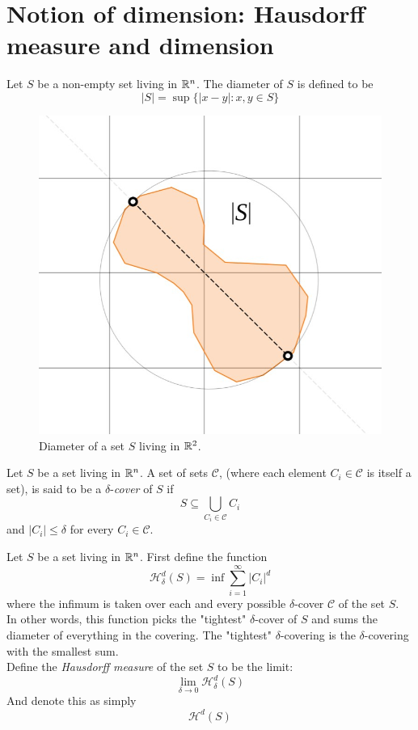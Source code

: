 \documentclass[11pt]{ekblite}
\begin{document}
\section{Notion of dimension: Hausdorff measure and dimension}
\begin{definition}
	Let $S$ be a non-empty set living in $\mathbb{R}^n$. The diameter of $S$ is defined to be 
	\[|S| = \sup \{|x - y| : x,y \in S\}\] 
\end{definition}
\begin{figure}[h]
	\includegraphics[scale=0.25]{img/c14.jpg}
	\caption{Diameter of a set $S$ living in $\mathbb{R}^2$.}
\end{figure}
\begin{definition}
	Let $S$ be a set living in $\mathbb{R}^n$. A set of sets $\mathcal{C}$, (where each element $C_i \in \mathcal{C}$ is itself a set), is said to be a $\delta$-\textit{cover} of $S$ if 
	\[S \subseteq \bigcup_{C_i \in \mathcal{C}} C_i\]
	and $|C_i| \le \delta$ for every $C_i \in \mathcal{C}$.\cite{falconer1} 
\end{definition}
\begin{definition}
	Let $S$ be a set living in $\mathbb{R}^n$. First define the function
	\[\mathcal{H}_{\delta}^{d}(S) = \inf \sum_{i=1}^{\infty} |C_i|^d\]
	where the infimum is taken over each and every possible $\delta$-cover $\mathcal{C}$ of the set $S$.\cite{falconer1}
	\\[0.2in]In other words, this function picks the "tightest" $\delta$-cover of $S$ and sums the diameter of everything in the covering. The "tightest" $\delta$-covering is the $\delta$-covering with the smallest sum.
	\\[0.2in]Define the \textit{Hausdorff measure} of the set $S$ to be the limit:
	\[\lim_{\delta \rightarrow 0} \mathcal{H}_{\delta}^d(S) \]
	And denote this as simply
	\[\mathcal{H}^d(S)\]
\end{definition}
\end{document}
